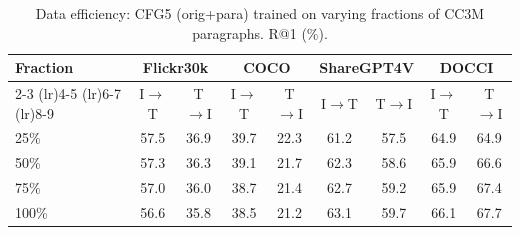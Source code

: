 \begin{table}[t]
\centering
\caption{Data efficiency: CFG5 (orig+para) trained on varying fractions of CC3M paragraphs. R@1 (\%).}
\label{tab:data_efficiency}
\small
\setlength{\tabcolsep}{4pt}
\begin{tabular}{lcccccccc}
\toprule
\textbf{Fraction} & \multicolumn{2}{c}{Flickr30k} & \multicolumn{2}{c}{COCO} & \multicolumn{2}{c}{ShareGPT4V} & \multicolumn{2}{c}{DOCCI} \\
\cmidrule(lr){2-3}
\cmidrule(lr){4-5}
\cmidrule(lr){6-7}
\cmidrule(lr){8-9}
 & I$\to$T & T$\to$I & I$\to$T & T$\to$I & I$\to$T & T$\to$I & I$\to$T & T$\to$I \\
\midrule
25\% & 57.5 & 36.9 & 39.7 & 22.3 & 61.2 & 57.5 & 64.9 & 64.9 \\
50\% & 57.3 & 36.3 & 39.1 & 21.7 & 62.3 & 58.6 & 65.9 & 66.6 \\
75\% & 57.0 & 36.0 & 38.7 & 21.4 & 62.7 & 59.2 & 65.9 & 67.4 \\
100\% & 56.6 & 35.8 & 38.5 & 21.2 & 63.1 & 59.7 & 66.1 & 67.7 \\
\bottomrule
\end{tabular}
\end{table}
